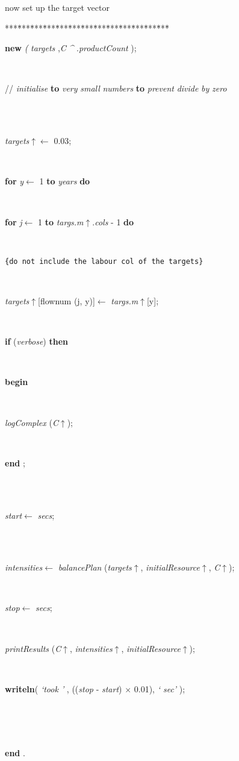 \documentclass[10pt, a4paper]{article}
\begin{document}
now set up the target vector
\begin{tabbing}
***\=***\=***\=***\=***\=***\=***\=***\=***\=***\=***\=***\=***\=\kill
\+ \\
\parbox{14cm}{\textsf{\textbf{new} \textit{(} \textit{targets}  ,\textit{C} \textit{\^{}} .\textit{productCount} );}}\\
\parbox{14cm}{\textsf{// \textit{initialise}  \textbf{to}  \textit{very}  \textit{small}  \textit{numbers}  \textbf{to}  \textit{prevent}  \textit{divide}  \textit{by}  \textit{zero} }}\\
\\
\parbox{14cm}{\textsf{\textit{targets}$\uparrow$\textit{}$\leftarrow$ 0.03}; }\\
\+\parbox{14cm}{\textsf {\textbf {for } \textsf{\textit{y}$\leftarrow$ 1} \textbf{ to } \textsf{\textit{years}} \textbf{ do } }}\\
\+\parbox{14cm}{\textsf {\textbf {for } \textsf{\textit{j}$\leftarrow$ 1} \textbf{ to } \textsf{\textit{targs.m}$\uparrow$.\textit{cols} - 1} \textbf{ do } }}\\
\parbox{14cm}{\texttt{\small{\{do not include the labour col of the targets\}}}}\\
\-\-\parbox{14cm}{\textsf{\textit{targets}$\uparrow$\textit{}[flownum (j, y)]$\leftarrow$ \textit{targs.m}$\uparrow$\textit{}[y]}; }\\
\+\parbox{14cm}{\textsf {\textbf {if } \textsf{(\textit{verbose})} \textbf{ then } }}\\
\<\parbox{14cm}{\textsf{\textbf{begin} }}\\
\parbox{14cm}{\textsf{\textit{logComplex} (\textit{C}$\uparrow$\textit{})}; }\\
\<\-\parbox{14cm}{\textsf{\textbf{end} ;}}\\
\\
\parbox{14cm}{\textsf{\textit{start}$\leftarrow$ \textit{secs}}; }\\
\\
\parbox{14cm}{\textsf{\textit{intensities}$\leftarrow$ \textit{balancePlan} (\textit{targets}$\uparrow$\textit{}, \textit{initialResource}$\uparrow$\textit{}, \textit{C}$\uparrow$\textit{})}; }\\
\parbox{14cm}{\textsf{\textit{stop}$\leftarrow$ \textit{secs}}; }\\
\parbox{14cm}{\textsf{\textit{printResults} (\textit{C}$\uparrow$\textit{}, \textit{intensities}$\uparrow$\textit{}, \textit{initialResource}$\uparrow$\textit{})}; }\\
\parbox{14cm}{\textsf{\textbf{writeln}(\textit{\textrm{\textup { `took ' } }}, ((\textit{stop} - \textit{start}) $\times$ 0.01), \textit{\textrm{\textup { ` sec' } }})}; }\\
\\
\\
\<\-\parbox{14cm}{\textsf{\textbf{end} .}}\\
\end{tabbing}
\end{document}
